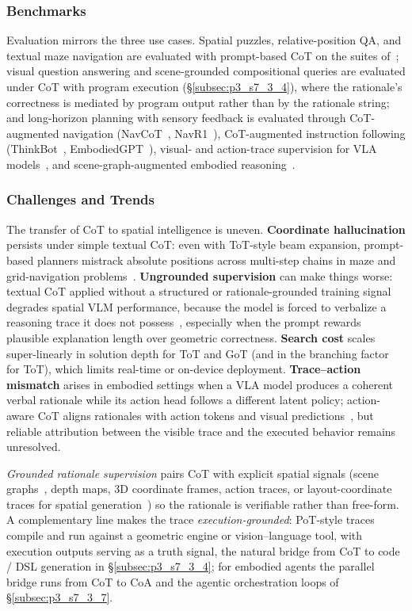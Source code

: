 \subsubsection{Benchmarks}
Evaluation mirrors the three use cases.
Spatial puzzles, relative-position QA, and textual maze navigation are evaluated with prompt-based CoT on the suites of~\cite{hu2023chain,zhang2025mitigating}; visual question answering and scene-grounded compositional queries are evaluated under CoT with program execution (§\ref{subsec:p3_s7_3_4}), where the rationale's correctness is mediated by program output rather than by the rationale string; and long-horizon planning with sensory feedback is evaluated through CoT-augmented navigation (NavCoT~\cite{lin2025navcot}, NavR1~\cite{liu2025navr1}), CoT-augmented instruction following (ThinkBot~\cite{lu2023thinkbot}, EmbodiedGPT~\cite{mu2023embodiedgpt}), visual- and action-trace supervision for VLA models~\cite{zhao2025cotvla,zhong2026acotvla}, and scene-graph-augmented embodied reasoning~\cite{zhang2025embodiedvsr}.


\subsubsection{Challenges and Trends}
The transfer of CoT to spatial intelligence is uneven.
\textbf{Coordinate hallucination} persists under simple textual CoT: even with ToT-style beam expansion, prompt-based planners mistrack absolute positions across multi-step chains in maze and grid-navigation problems~\cite{zhang2025mitigating}.
\textbf{Ungrounded supervision} can make things worse: textual CoT applied without a structured or rationale-grounded training signal degrades spatial VLM performance, because the model is forced to verbalize a reasoning trace it does not possess~\cite{ji2025enhancing,kancheti2026cotdegrades}, especially when the prompt rewards plausible explanation length over geometric correctness.
\textbf{Search cost} scales super-linearly in solution depth for ToT and GoT (and in the branching factor for ToT), which limits real-time or on-device deployment.
\textbf{Trace--action mismatch} arises in embodied settings when a VLA model produces a coherent verbal rationale while its action head follows a different latent policy; action-aware CoT aligns rationales with action tokens and visual predictions~\cite{zhong2026acotvla}, but reliable attribution between the visible trace and the executed behavior remains unresolved.

\emph{Grounded rationale supervision} pairs CoT with explicit spatial signals (scene graphs~\cite{zhang2025embodiedvsr}, depth maps, 3D coordinate frames, action traces, or layout-coordinate traces for spatial generation~\cite{chen2026spatialcotgeneration}) so the rationale is verifiable rather than free-form.
A complementary line makes the trace \emph{execution-grounded}: PoT-style traces compile and run against a geometric engine or vision--language tool, with execution outputs serving as a truth signal, the natural bridge from CoT to code / DSL generation in §\ref{subsec:p3_s7_3_4}; for embodied agents the parallel bridge runs from CoT to CoA and the agentic orchestration loops of §\ref{subsec:p3_s7_3_7}.
